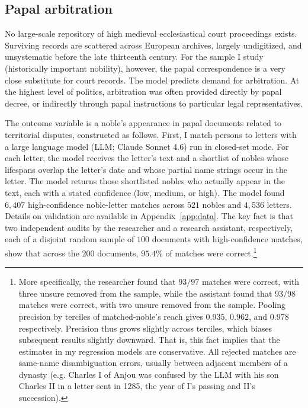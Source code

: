 \documentclass[12pt]{article}
\theoremstyle{definition}
\theoremstyle{remark}
\begin{document}
\subsection{Papal arbitration}

No large-scale repository of high medieval ecclesiastical court proceedings exists. Surviving records are scattered across European archives, largely undigitized, and unsystematic before the late thirteenth century. For the sample I study (historically important nobility), however, the papal correspondence is a very close substitute for court records. The model predicts demand for arbitration. At the highest level of politics, arbitration was often provided directly by papal decree, or indirectly through papal instructions to particular legal representatives.

The outcome variable is a noble's appearance in papal documents related to territorial disputes, constructed as follows. First, I match persons to letters with a large language model (LLM; Claude Sonnet 4.6) run in closed-set mode. For each letter, the model receives the letter's text and a shortlist of nobles whose lifespans overlap the letter's date and whose partial name strings occur in the letter. The model returns those shortlisted nobles who actually appear in the text, each with a stated confidence (low, medium, or high). The model found $6{,}407$ high-confidence noble-letter matches across $521$ nobles and $4{,}536$ letters. Details on validation are available in Appendix~\ref{app:data}. The key fact is that two independent audits by the researcher and a research assistant, respectively, each of a disjoint random sample of $100$ documents with high-confidence matches, show that across the $200$ documents, $95.4\%$ of matches were correct.\footnote{More specifically, the researcher found that  $93/97$ matches were correct, with three unsure removed from the sample, while the assistant found that $93/98$ matches were correct, with two unsure removed from the sample. Pooling precision by terciles of matched-noble's reach gives $0.935$, $0.962$, and $0.978$ respectively. Precision thus grows slightly across terciles, which biases subsequent results slightly downward. That is, this fact implies that the estimates in my regression models are conservative. All rejected matches are same-name disambiguation errors, usually between adjacent members of a dynasty (e.g. Charles I of Anjou was confused by the LLM with his son Charles II in a letter sent in 1285, the year of I's passing and II's succession).}
\end{document}
